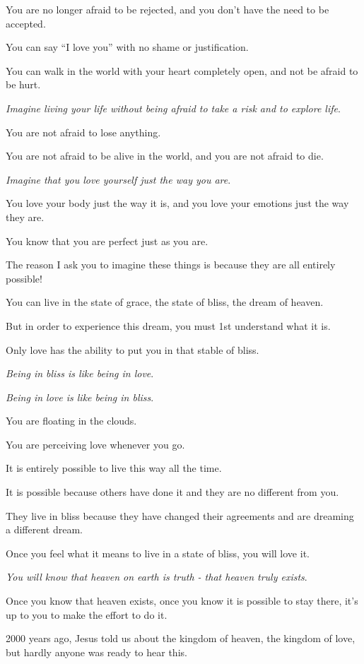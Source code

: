 \documentclass{article}
\numberwithin{equation}{section}
\begin{document}
You are no longer afraid to be rejected, and you don't have the need to be accepted.

You can say ``I love you'' with no shame or justification.

You can walk in the world with your heart completely open, and not be afraid to be hurt.

%
\textit{Imagine living your life without being afraid to take a risk and to explore life}.

You are not afraid to lose anything.

You are not afraid to be alive in the world, and you are not afraid to die.

%
\textit{Imagine that you love yourself just the way you are}.

You love your body just the way it is, and you love your emotions just the way they are.

You know that you are perfect just as you are.

%
The reason I ask you to imagine these things is because they are all entirely possible!

You can live in the state of grace, the state of bliss, the dream of heaven.

But in order to experience this dream, you must 1st understand what it is.

%
Only love has the ability to put you in that stable of bliss.

\textit{Being in bliss is like being in love}.

\textit{Being in love is like being in bliss}.

You are floating in the clouds.

You are perceiving love whenever you go.

It is entirely possible to live this way all the time.

It is possible because others have done it and they are no different from you.

They live in bliss because they have changed their agreements and are dreaming a different dream.

%
Once you feel what it means to live in a state of bliss, you will love it.

\textit{You will know that heaven on earth is truth - that heaven truly exists}.

Once you know that heaven exists, once you know it is possible to stay there, it's up to you to make the effort to do it.

2000 years ago, Jesus told us about the kingdom of heaven, the kingdom of love, but hardly anyone was ready to hear this.
\end{document}
